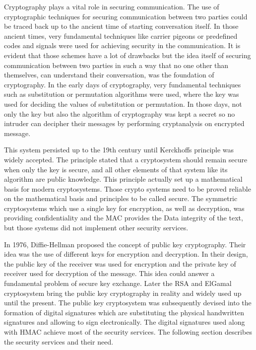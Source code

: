 Cryptography plays a vital role in securing communication. The use of cryptographic techniques for securing communication between two parties could be traced back up to the ancient time of starting conversation itself. In those ancient times, very fundamental techniques like carrier pigeons or predefined codes and signals were used for achieving security in the communication. It is evident that those schemes have a lot of drawbacks but the idea itself of securing communication between two parties in such a way that no one other than themselves, can understand their conversation, was the foundation of cryptography. In the early days of cryptography, very fundamental techniques such as substitution or permutation algorithms were used, where the key was used for deciding the values of substitution or permutation. In those days, not only the key but also the algorithm of cryptography was kept a secret so no intruder can decipher their messages by performing cryptanalysis on encrypted message. 

This system persisted up to the 19th century until Kerckhoffs principle was widely accepted. The principle stated that a cryptosystem should remain secure when only the key is secure, and all other elements of that system like its algorithm are public knowledge. This principle actually set up a mathematical basis for modern cryptosystems. Those crypto systems need to be proved reliable on the mathematical basis and principles to be called secure. The symmetric cryptosystems which use a single key for encryption, as well as decryption, was providing confidentiality and the MAC provides the Data integrity of the text, but those systems did not implement other security services.

In 1976, Diffie-Hellman proposed the concept of public key cryptography. Their idea was the use of different keys for encryption and decryption. In their design, the public key of the receiver was used for encryption and the private key of receiver used for decryption of the message. This idea could answer a fundamental problem of secure key exchange. Later the RSA and ElGamal cryptosystem bring the public key cryptography in reality and widely used up until the present. The public key cryptosystem was subsequently devised into the formation of digital signatures which are substituting the physical handwritten signatures and allowing to sign electronically. The digital signatures used along with HMAC achieve most of the security services. The following section describes the security services and their need.

